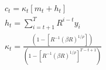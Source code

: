 \begin{align}
c_t = \kappa_t[m_t + h_t]\\
h_t = \sum_{i=t+1}^{T}R^{i-t}y_{i} \\
\kappa_t = \frac{(1 - {[R^{-1}(\beta R)^{1/\rho}]})}{(1 - {[R^{-1}(\beta R)^{1/\rho}]}^{T-t+1})}
\end{align}